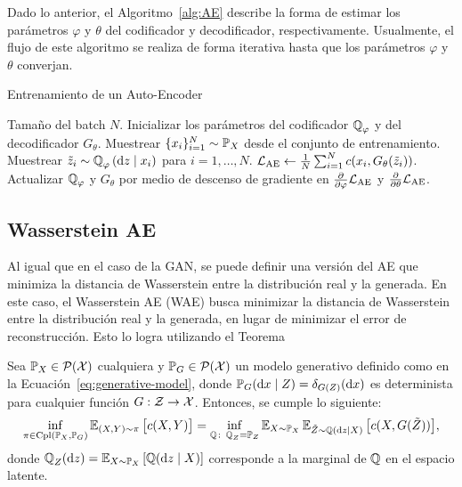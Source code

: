 Dado lo anterior, el Algoritmo~\ref{alg:AE} describe la forma de estimar los parámetros $\varphi$ y $\theta$ del codificador y decodificador, respectivamente. Usualmente, el flujo de este algoritmo se realiza de forma iterativa hasta que los parámetros $\varphi$ y $\theta$ converjan.

\begin{algorithm}[H]
    \caption{Entrenamiento de un Auto-Encoder}\label{alg:AE}
    \begin{algorithmic}[1]
        \Require Tamaño del batch $N$.
        \State Inicializar los parámetros del codificador $\ProbQ_\varphi$ y del decodificador $G_\theta$.
        \State Muestrear $\{x_i\}_{i=1}^{N} \sim \Prob_X$ desde el conjunto de entrenamiento.
        \State Muestrear $\tilde z_i \sim \ProbQ_\varphi \left( \dd z \mid x_i \right)$ para $i=1,\ldots,N$.
        \State $\mathcal{L}_{\mathrm{AE}}\gets \frac{1}{N}\sum_{i=1}^{N} c(x_i, G_\theta(\tilde z_i))$.
        \State Actualizar $\ProbQ_\varphi$ y $G_\theta$ por medio de descenso de gradiente en $\pdv{\varphi} \cL_{\mathrm{AE}}$ y $\pdv{\theta} \mathcal{L}_{\mathrm{AE}}$.
        \EndWhile
    \end{algorithmic}

\end{algorithm}


\subsection{Wasserstein AE}\label{ssec:WAE}  %

Al igual que en el caso de la GAN, se puede definir una versión del AE que minimiza la distancia de Wasserstein entre la distribución real y la generada. En este caso, el Wasserstein AE (WAE) \cite{tolstikhin2017wasserstein} busca minimizar la distancia de Wasserstein entre la distribución real y la generada, en lugar de minimizar el error de reconstrucción. Esto lo logra utilizando el Teorema

\begin{theorem}
    Sea $\Prob_X\in \ProbSpace$ cualquiera y  $\Prob_G\in \ProbSpace$ un modelo generativo definido como en la Ecuación~\eqref{eq:generative-model}, donde $\Prob_G(\dd x \mid Z) = \delta_{G(Z)}(\dd x)$ es determinista para cualquier función $G:\mathcal{Z} \to \mathcal{X}$. Entonces, se cumple lo siguiente:
    \begin{equation}
        \inf_{\pi\in\Cpl(\Prob_X, \Prob_G)} \Exp_{(X, Y)\sim\pi} \qty\big[ c(X, Y) ] = \inf_{\ProbQ \colon \ProbQ_Z = \Prob_Z} \Exp_{X\sim\Prob_X} \Exp_{\tilde Z\sim\ProbQ(\dd z \mid X)} \qty\big[ c(X, G(\tilde Z)) ],
    \end{equation}
    donde $\ProbQ_Z(\dd z) = \Exp_{X\sim \Prob_X} \qty[\ProbQ(\dd z \mid X)]$ corresponde a la marginal de $\ProbQ$ en el espacio latente.
\end{theorem}

